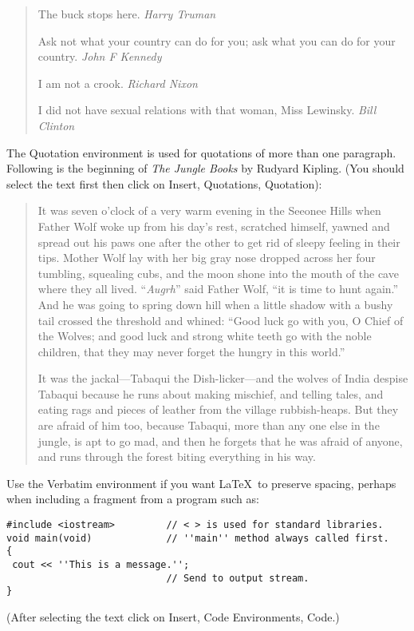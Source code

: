 \documentclass{article}%
\begin{document}
\begin{quote}
The buck stops here. \emph{Harry Truman}

Ask not what your country can do for you; ask what you can do for your
country. \emph{John F Kennedy}

I am not a crook. \emph{Richard Nixon}

I did not have sexual relations with that woman, Miss Lewinsky. \emph{Bill Clinton}
\end{quote}

The Quotation environment is used for quotations of more than one paragraph. Following
is the beginning of \emph{The Jungle Books} by Rudyard Kipling. (You should select
the text first then click on Insert, Quotations, Quotation):

\begin{quotation}
It was seven o'clock of a very warm evening in the Seeonee Hills when Father Wolf woke
up from his day's rest, scratched himself, yawned  and spread out his paws one after
the other to get rid of sleepy feeling in their tips. Mother Wolf lay with her big gray
nose dropped across her four tumbling, squealing cubs, and the moon shone into the
mouth of the cave where they all lived. ``\emph{Augrh}'' said Father Wolf, ``it is time
to hunt again.'' And he was going to spring down hill when a little shadow with a bushy
tail crossed the threshold and whined: ``Good luck go with you, O Chief of the Wolves;
and good luck and strong white teeth go with the noble children, that they may never
forget the hungry in this world.''

It was the jackal---Tabaqui the Dish-licker---and the wolves of India despise Tabaqui
because he runs about making mischief, and telling tales, and eating rags and pieces of
leather from the village rubbish-heaps. But they are afraid of him too, because
Tabaqui, more than any one else in the jungle, is apt to go mad, and then he forgets
that he was afraid of anyone, and runs through the forest biting everything in his way.
\end{quotation}

Use the Verbatim environment if you want \LaTeX\ to preserve spacing, perhaps when
including a fragment from a program such as:
\begin{verbatim}
#include <iostream>         // < > is used for standard libraries.
void main(void)             // ''main'' method always called first.
{
 cout << ''This is a message.'';
                            // Send to output stream.
}
\end{verbatim}
(After selecting the text click on Insert, Code Environments, Code.)
\end{document}
